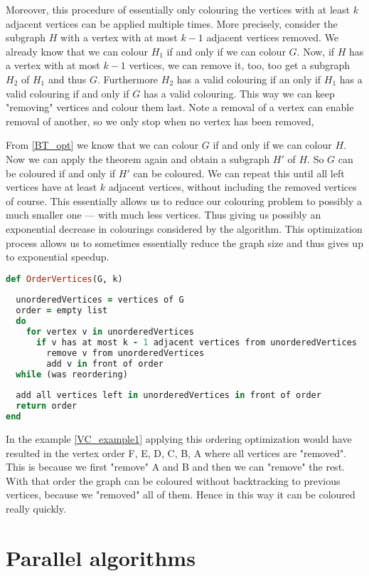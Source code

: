 \documentclass{report}
\theoremstyle{plain}
\theoremstyle{definition}
\theoremstyle{remark}
\numberwithin{definition}{chapter}
\numberwithin{example}{chapter}
\numberwithin{figure}{chapter}
\numberwithin{theorem}{chapter}
\numberwithin{lemma}{chapter}
\begin{document}
Moreover, this procedure of essentially only colouring the vertices with at least $k$ adjacent vertices can be applied multiple times. More precisely, consider the subgraph $H$ with a vertex with at most $k-1$ adjacent vertices removed. We already know that we can colour $H_1$ if and only if we can colour $G$. Now, if $H$ has a vertex with at most $k-1$ vertices, we can remove it, too, too get a subgraph $H_2$ of $H_1$ and thus $G$. Furthermore $H_2$ has a valid colouring if an only if $H_1$ has a valid colouring if and only if $G$ has a valid colouring. This way we can keep "removing" vertices and colour them last. Note a removal of a vertex can enable removal of another, so we only stop when no vertex has been removed,

From \ref{BT_opt} we know that we can colour $G$ if and only if we can colour $H$. Now we can apply the theorem again and obtain a subgraph $H'$ of $H$. So $G$ can be coloured if and only if $H'$ can be coloured. We can repeat this until all left vertices have at least $k$ adjacent vertices, without including the removed vertices of course. This essentially allows us to reduce our colouring problem to possibly a much smaller one --- with much less vertices. Thus giving us possibly an exponential decrease in colourings considered by the algorithm. This optimization process allows us to sometimes essentially reduce the graph size and thus gives up to exponential speedup.

\begin{lstlisting}[language=Ruby]
def OrderVertices(G, k)
  
  unorderedVertices = vertices of G
  order = empty list
  do
    for vertex v in unorderedVertices
      if v has at most k - 1 adjacent vertices from unorderedVertices
        remove v from unorderedVertices
        add v in front of order
  while (was reordering)
  
  add all vertices left in unorderedVertices in front of order
  return order
end
\end{lstlisting}

In the example \ref{VC_example1} applying this ordering optimization would have resulted in the vertex order F, E, D, C, B, A where all vertices are "removed". This is because we first "remove" A and B and then we can "remove" the rest. With that order the graph can be coloured without backtracking to previous vertices, because we "removed" all of them. Hence in this way it can be coloured really quickly.

\section{Parallel algorithms}
\end{document}
